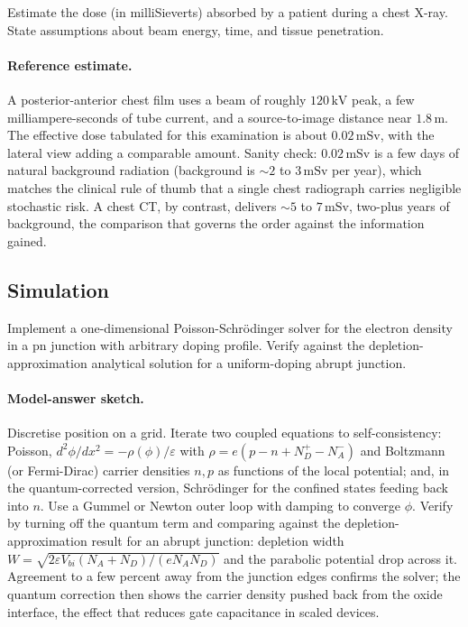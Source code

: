 \begin{exercise}
Estimate the dose (in milliSieverts) absorbed by a patient during a
chest X-ray. State assumptions about beam energy, time, and tissue
penetration.
\paragraph{Reference estimate.} A posterior-anterior chest film uses a
beam of roughly $120\,\si{\kilo\volt}$ peak, a few milliampere-seconds
of tube current, and a source-to-image distance near $1.8\,\si{\meter}$.
The effective dose tabulated for this examination is about $0.02\,\si{
\milli\sievert}$, with the lateral view adding a comparable amount.
Sanity check: $0.02\,\si{\milli\sievert}$ is a few days of natural
background radiation (background is $\sim 2$ to $3\,\si{\milli\sievert}$
per year), which matches the clinical rule of thumb that a single chest
radiograph carries negligible stochastic risk. A chest CT, by contrast,
delivers $\sim 5$ to $7\,\si{\milli\sievert}$, two-plus years of
background, the comparison that governs the order against the
information gained.
\end{exercise}

\subsection*{Simulation}

\begin{exercise}
Implement a one-dimensional Poisson-Schr\"odinger solver for the
electron density in a pn junction with arbitrary doping profile.
Verify against the depletion-approximation analytical solution for
a uniform-doping abrupt junction.
\paragraph{Model-answer sketch.} Discretise position on a grid. Iterate
two coupled equations to self-consistency: Poisson, $d^{2}\phi/dx^{2} =
-\rho(\phi)/\varepsilon$ with $\rho = e(p - n + N_{D}^{+} - N_{A}^{-})$
and Boltzmann (or Fermi-Dirac) carrier densities $n,p$ as functions of
the local potential; and, in the quantum-corrected version,
Schr\"odinger for the confined states feeding back into $n$. Use a
Gummel or Newton outer loop with damping to converge $\phi$. Verify by
turning off the quantum term and comparing against the
depletion-approximation result for an abrupt junction: depletion width
$W = \sqrt{2\varepsilon V_{bi}(N_{A}+N_{D})/(eN_{A}N_{D})}$ and the
parabolic potential drop across it. Agreement to a few percent away
from the junction edges confirms the solver; the quantum correction
then shows the carrier density pushed back from the oxide interface, the
effect that reduces gate capacitance in scaled devices.
\end{exercise}

